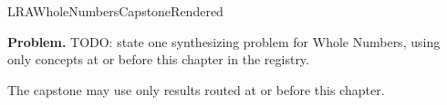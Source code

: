 \ifcsname LRAWholeNumbersCapstoneRendered\endcsname
\else
\expandafter\gdef\csname LRAWholeNumbersCapstoneRendered\endcsname{}

\newpage
{}
\label{cap:whole-numbers}

\begin{tcolorbox}[
  colback=gray!6,
  colframe=gray!40,
  arc=2pt,
  left=8pt, right=8pt, top=6pt, bottom=6pt,
  title={\small\textbf{Capstone Problem}},
  fonttitle=\small\bfseries
]
\textbf{Problem.}
TODO: state one synthesizing problem for Whole Numbers, using only concepts at or
before this chapter in the registry.
\end{tcolorbox}

\begin{remark*}
The capstone may use only results routed at or before this chapter.
\end{remark*}

\clearpage
\fi
